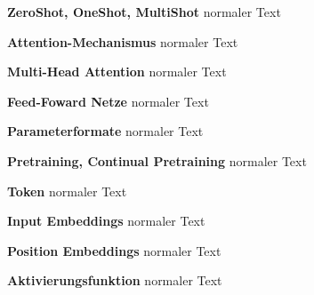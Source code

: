 \begin{definition}
    \textbf{ZeroShot, OneShot, MultiShot} normaler Text
\end{definition}

\begin{definition}
    \textbf{Attention-Mechanismus} normaler Text
\end{definition}

\begin{definition}
    \textbf{Multi-Head Attention} normaler Text
\end{definition}

\begin{definition}
    \textbf{Feed-Foward Netze} normaler Text
\end{definition}

\begin{definition}
    \textbf{Parameterformate} normaler Text
\end{definition}

\begin{definition}
    \textbf{Pretraining, Continual Pretraining} normaler Text
\end{definition}

\begin{definition}
    \textbf{Token} normaler Text
\end{definition}

\begin{definition}
    \textbf{Input Embeddings} normaler Text
\end{definition}

\begin{definition}
    \textbf{Position Embeddings} normaler Text
\end{definition}



\begin{definition}

\end{definition}

\begin{definition}[Hyperparameter]
    
\end{definition}

\begin{definition}
    \textbf{Aktivierungsfunktion} normaler Text
\end{definition}

